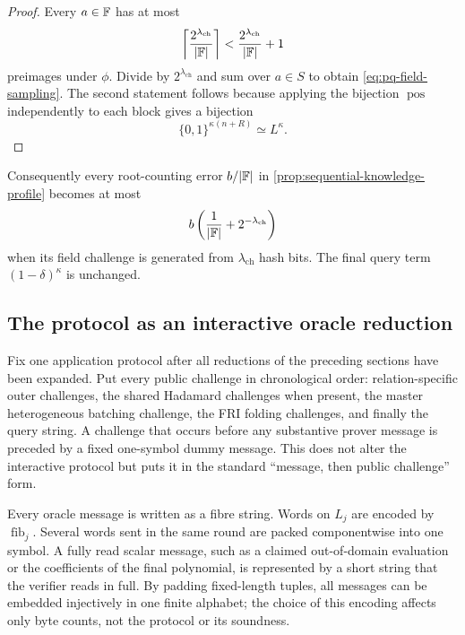 \begin{proof}
Every $a\in\mathbb{F}$ has at most
\[
  \left\lceil\frac{2^{\lambda_{\mathrm{ch}}}}{|\mathbb{F}|}\right\rceil
  <\frac{2^{\lambda_{\mathrm{ch}}}}{|\mathbb{F}|}+1
\]
preimages under $\phi$.  Divide by $2^{\lambda_{\mathrm{ch}}}$ and sum over $a\in S$ to obtain \eqref{eq:pq-field-sampling}.  The second statement follows because applying the bijection $\operatorname{pos}$ independently to each block gives a bijection
\[
  \{0,1\}^{\kappa(n+R)}\simeq L^\kappa.
\]
\end{proof}

Consequently every root-counting error $b/|\mathbb{F}|$ in \cref{prop:sequential-knowledge-profile} becomes at most
\begin{equation}
  b\left(\frac1{|\mathbb{F}|}+2^{-\lambda_{\mathrm{ch}}}\right)
  \label{eq:pq-lifted-field-error}
\end{equation}
when its field challenge is generated from $\lambda_{\mathrm{ch}}$ hash bits.  The final query term $(1-\delta)^\kappa$ is unchanged.

\subsection{The protocol as an interactive oracle reduction}
\label{sec:pq-ior}

Fix one application protocol after all reductions of the preceding sections have been expanded.  Put every public challenge in chronological order: relation-specific outer challenges, the shared Hadamard challenges when present, the master heterogeneous batching challenge, the FRI folding challenges, and finally the query string.  A challenge that occurs before any substantive prover message is preceded by a fixed one-symbol dummy message.  This does not alter the interactive protocol but puts it in the standard ``message, then public challenge'' form.

Every oracle message is written as a fibre string.  Words on $L_j$ are encoded by $\operatorname{fib}_j$.  Several words sent in the same round are packed componentwise into one symbol.  A fully read scalar message, such as a claimed out-of-domain evaluation or the coefficients of the final polynomial, is represented by a short string that the verifier reads in full.  By padding fixed-length tuples, all messages can be embedded injectively in one finite alphabet; the choice of this encoding affects only byte counts, not the protocol or its soundness.

